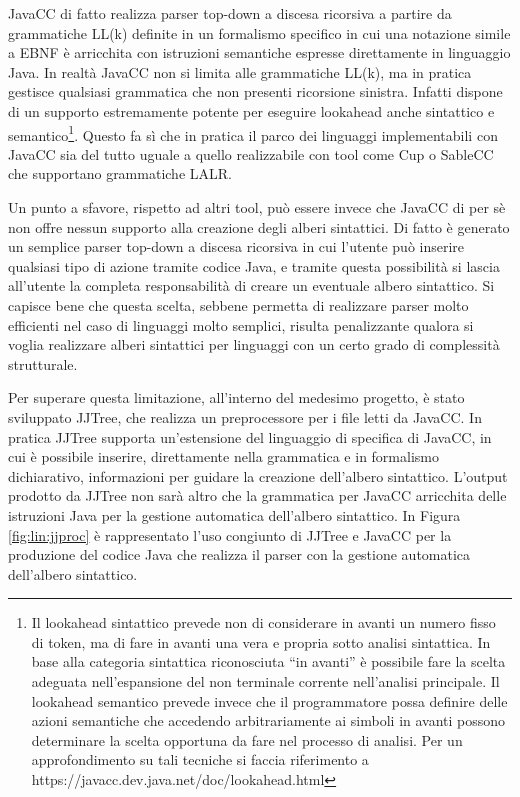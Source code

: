 JavaCC di fatto realizza parser top-down a discesa ricorsiva a partire da
grammatiche LL(k) definite in un formalismo specifico in cui una notazione simile
a EBNF è arricchita con istruzioni semantiche espresse direttamente in linguaggio
Java. In realtà JavaCC non si limita alle grammatiche LL(k), ma in pratica
gestisce qualsiasi grammatica che non presenti ricorsione sinistra. Infatti
dispone di un supporto estremamente potente per eseguire lookahead anche
sintattico e semantico\footnote{Il lookahead sintattico prevede non di
considerare in avanti un numero fisso di token, ma di fare in avanti una vera e
propria sotto analisi sintattica. In base alla categoria sintattica riconosciuta
``in avanti'' è possibile fare la scelta adeguata nell'espansione del non
terminale corrente nell'analisi principale. Il lookahead semantico prevede invece
che il programmatore  possa definire delle azioni semantiche che accedendo
arbitrariamente ai simboli in avanti possono determinare la scelta opportuna da
fare nel processo di analisi. Per un approfondimento su tali tecniche si faccia
riferimento a https://javacc.dev.java.net/doc/lookahead.html}. Questo fa sì che
in pratica il parco dei linguaggi implementabili con JavaCC sia del tutto uguale
a quello realizzabile con tool come Cup o SableCC che supportano grammatiche
LALR.

Un punto a sfavore, rispetto ad altri tool, può essere invece che JavaCC di per
sè non offre nessun supporto alla creazione degli alberi sintattici. Di fatto
è generato un semplice parser top-down a discesa ricorsiva in cui l'utente può
inserire qualsiasi tipo di azione tramite codice Java, e tramite questa
possibilità si lascia all'utente la completa responsabilità di creare un
eventuale albero sintattico. Si capisce bene che questa scelta, sebbene permetta
di realizzare parser molto efficienti nel caso di linguaggi molto semplici,
risulta penalizzante qualora si voglia realizzare alberi sintattici per
linguaggi con un certo grado di complessità strutturale.

Per superare questa limitazione, all'interno del medesimo progetto, è stato
sviluppato JJTree, che realizza un preprocessore per i file letti da JavaCC. In
pratica JJTree supporta un'estensione del linguaggio di specifica di JavaCC, in
cui è possibile inserire, direttamente nella grammatica e in formalismo
dichiarativo, informazioni per guidare la creazione dell'albero sintattico.
L'output prodotto da JJTree non sarà altro che la grammatica per JavaCC
arricchita delle istruzioni Java per la gestione automatica dell'albero
sintattico. In Figura \ref{fig:lin:jjproc} è rappresentato l'uso
congiunto di JJTree e JavaCC per la produzione del codice Java che realizza il
parser con la gestione automatica dell'albero sintattico.

